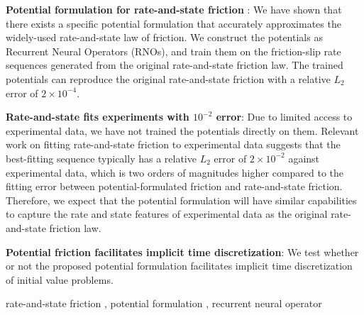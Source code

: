 \documentclass[final,a4paper]{elsarticle}
\begin{document}
\begin{frontmatter}
\begin{abstract}
\end{abstract}


\begin{highlights}
\item \textbf{Potential formulation for rate-and-state friction }: We have shown that there exists a specific potential formulation that accurately approximates the widely-used rate-and-state law of friction. 
We construct the potentials as Recurrent Neural Operators (RNOs), 
and train them on the friction-slip rate sequences generated from the original rate-and-state friction law. 
The trained potentials can reproduce the original rate-and-state friction with a relative $L_2$ error of $2\times10^{-4}$. 

\item \textbf{Rate-and-state fits experiments with $10^{-2}$ error}: Due to limited access to experimental data, 
we have not trained the potentials directly on them. 
Relevant work on fitting rate-and-state friction to experimental data suggests that the best-fitting sequence typically has a relative $L_2$ error of $2\times 10^{-2}$ against experimental data, 
which is two orders of magnitudes higher compared to the fitting error between potential-formulated friction and rate-and-state friction. 
Therefore, 
we expect that the potential formulation will have similar capabilities to capture the rate and state features of experimental data as the original rate-and-state friction law.


\item \textbf{Potential friction facilitates implicit time discretization}: We test whether or not the proposed potential formulation facilitates implicit time discretization of initial value problems.


\end{highlights}

\begin{keyword}
rate-and-state friction \sep 
potential formulation \sep 
recurrent neural operator
\end{keyword}

\end{frontmatter}









\newpage
  
 
\end{document}
